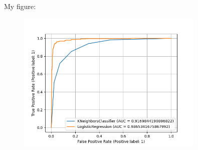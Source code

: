 \documentclass[a4paper]{article}
\theoremstyle{definition}
\newenvironment{soln}{
    \leavevmode\color{blue}\ignorespaces
}{}
\begin{document}
\begin{enumerate}
        \begin{soln} My figure:
        \begin{figure}[h]
		\centering
		\includegraphics[width=0.8\textwidth]{images/knnlogitROC.png}
	\end{figure} 
        \end{soln}
	
\end{enumerate}

\end{document}

